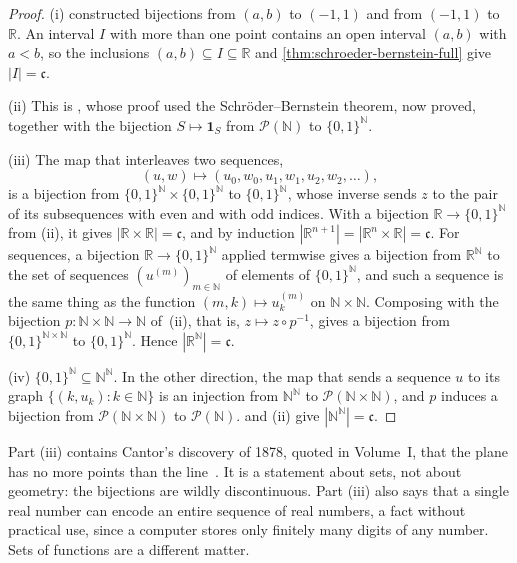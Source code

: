\begin{proof}
(i)  constructed bijections from $(a,b)$ to $(-1,1)$ and from $(-1,1)$ to $\mathbb R$. An interval $I$ with more than one point contains an open interval $(a,b)$ with $a<b$, so the inclusions $(a,b)\subseteq I\subseteq\mathbb R$ and \cref{thm:schroeder-bernstein-full} give $|I|=\mathfrak c$.

(ii) This is , whose proof used the Schr\"oder--Bernstein theorem, now proved, together with the bijection $S\mapsto\mathbf 1_S$ from $\mathcal P(\mathbb N)$ to $\{0,1\}^{\mathbb N}$.

(iii) The map that interleaves two sequences,
\[
(u,w)\mapsto(u_0,w_0,u_1,w_1,u_2,w_2,\ldots),
\]
is a bijection from $\{0,1\}^{\mathbb N}\times\{0,1\}^{\mathbb N}$ to $\{0,1\}^{\mathbb N}$, whose inverse sends $z$ to the pair of its subsequences with even and with odd indices. With a bijection $\mathbb R\to\{0,1\}^{\mathbb N}$ from (ii), it gives $|\mathbb R\times\mathbb R|=\mathfrak c$, and by induction $|\mathbb R^{n+1}|=|\mathbb R^n\times\mathbb R|=\mathfrak c$. For sequences, a bijection $\mathbb R\to\{0,1\}^{\mathbb N}$ applied termwise gives a bijection from $\mathbb R^{\mathbb N}$ to the set of sequences $(u^{(m)})_{m\in\mathbb N}$ of elements of $\{0,1\}^{\mathbb N}$, and such a sequence is the same thing as the function $(m,k)\mapsto u^{(m)}_k$ on $\mathbb N\times\mathbb N$. Composing with the bijection $p\colon\mathbb N\times\mathbb N\to\mathbb N$ of \,(ii), that is, $z\mapsto z\circ p^{-1}$, gives a bijection from $\{0,1\}^{\mathbb N\times\mathbb N}$ to $\{0,1\}^{\mathbb N}$. Hence $|\mathbb R^{\mathbb N}|=\mathfrak c$.

(iv) $\{0,1\}^{\mathbb N}\subseteq\mathbb N^{\mathbb N}$. In the other direction, the map that sends a sequence $u$ to its graph $\{(k,u_k): k\in\mathbb N\}$ is an injection from $\mathbb N^{\mathbb N}$ to $\mathcal P(\mathbb N\times\mathbb N)$, and $p$ induces a bijection from $\mathcal P(\mathbb N\times\mathbb N)$ to $\mathcal P(\mathbb N)$.  and (ii) give $|\mathbb N^{\mathbb N}|=\mathfrak c$.
\end{proof}

Part (iii) contains Cantor's discovery of 1878, quoted in Volume~I, that the plane has no more points than the line~\cite{cantor1878}. It is a statement about sets, not about geometry: the bijections are wildly discontinuous. Part (iii) also says that a single real number can encode an entire sequence of real numbers, a fact without practical use, since a computer stores only finitely many digits of any number. Sets of functions are a different matter.

